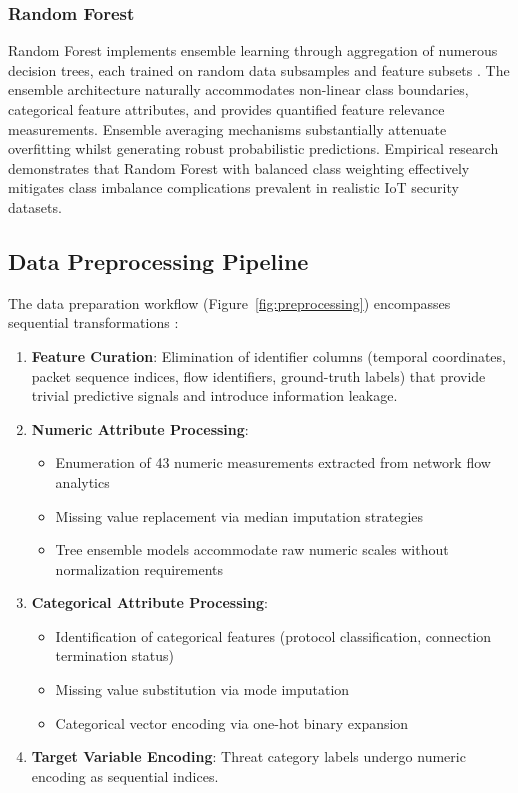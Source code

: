 \documentclass[conference]{IEEEtran}
\begin{document}
\subsubsection{Random Forest}

Random Forest implements ensemble learning through aggregation of numerous decision trees, each trained on random data subsamples and feature subsets \cite{b21}. The ensemble architecture naturally accommodates non-linear class boundaries, categorical feature attributes, and provides quantified feature relevance measurements. Ensemble averaging mechanisms substantially attenuate overfitting whilst generating robust probabilistic predictions. Empirical research demonstrates that Random Forest with balanced class weighting \cite{b22} effectively mitigates class imbalance complications prevalent in realistic IoT security datasets.

\subsection{Data Preprocessing Pipeline}

The data preparation workflow (Figure~\ref{fig:preprocessing}) encompasses sequential transformations \cite{b15}:

\begin{enumerate}
\item \textbf{Feature Curation}: Elimination of identifier columns (temporal coordinates, packet sequence indices, flow identifiers, ground-truth labels) that provide trivial predictive signals and introduce information leakage.

\item \textbf{Numeric Attribute Processing}:
\begin{itemize}
\item Enumeration of 43 numeric measurements extracted from network flow analytics
\item Missing value replacement via median imputation strategies
\item Tree ensemble models accommodate raw numeric scales without normalization requirements
\end{itemize}

\item \textbf{Categorical Attribute Processing}:
\begin{itemize}
\item Identification of categorical features (protocol classification, connection termination status)
\item Missing value substitution via mode imputation
\item Categorical vector encoding via one-hot binary expansion
\end{itemize}

\item \textbf{Target Variable Encoding}: Threat category labels undergo numeric encoding as sequential indices.
\end{enumerate}
\end{document}
